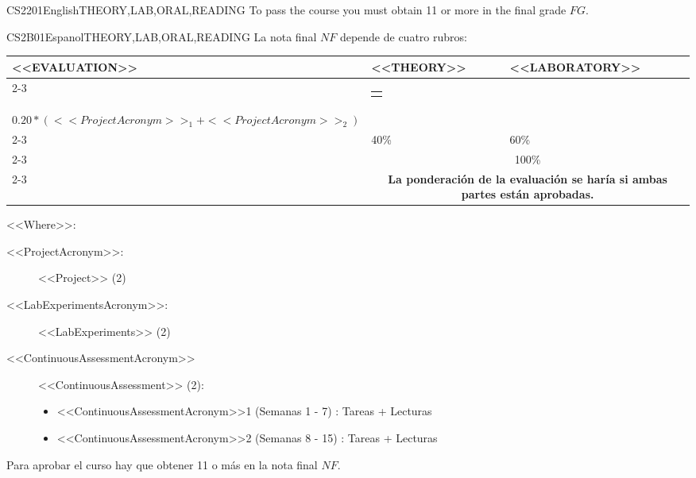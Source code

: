 \begin{evaluation}{CS2201}{English}{THEORY,LAB,ORAL,READING}
  \noindent To pass the course you must obtain 11 or more in the final grade $FG$.
  \end{evaluation}
 

  \begin{evaluation}{CS2B01}{Espanol}{THEORY,LAB,ORAL,READING}
  La nota final $NF$ depende de cuatro rubros:

  \begin{tabularx}{0.9\textwidth}{|X|p{}|p{}|} \hline
  \multirow{4}{*}{\uppercase{<<Evaluation>>}} & \uppercase{<<Theory>>} & \uppercase{<<Laboratory>>} \\ \cline{2-3}
  & %
      \begin{minipage}{0.95\textwidth}
      \begin{tabular}{l}
        $0.20*(<<ContinuousAssessmentAcronym>>_{1} + <<ContinuousAssessmentAcronym>>_{2})$ 
        \end{tabular} 
      \end{minipage} 
  & %
      \begin{minipage}{0.95\textwidth}
      \begin{tabular}{l}
        $0.10*(<<LabExperimentsAcronym>>_{2} + <<LabExperimentsAcronym>>_{3})$ + \\
        $0.20*(<<ProjectAcronym>>_{1} + <<ProjectAcronym>>_{2})$
      \end{tabular} 
      \end{minipage}                 \\ \cline{2-3}
  
  & %
  40\% 
  & %
  60\% \\ \cline{2-3}
  & \multicolumn{2}{c|}{100\%} \\ \cline{2-3}
  & \multicolumn{2}{c|}{\textbf{La ponderación de la evaluación se haría si ambas partes están aprobadas.}}  \\ \hline
  \end{tabularx}
    
  \vspace{2mm}
  \noindent <<Where>>:
  \begin{description}
    \item[<<ProjectAcronym>>:] <<Project>> (2)
    \item[<<LabExperimentsAcronym>>:] <<LabExperiments>> (2)
    \item[<<ContinuousAssessmentAcronym>>] <<ContinuousAssessment>> (2):
    \begin{itemize}
          \item <<ContinuousAssessmentAcronym>>1 (Semanas 1 - 7) : Tareas + Lecturas
          \item <<ContinuousAssessmentAcronym>>2 (Semanas 8 - 15) : Tareas + Lecturas
    \end{itemize}
  \end{description}
 
  \noindent Para aprobar el curso hay que obtener 11 o más en la nota final $NF$.
  \end{evaluation}
 

